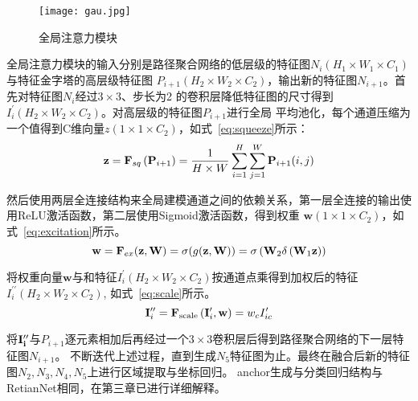 \begin{figure}[htbp]                     
  \centering                      
  \texttt{[image: gau.jpg]}                      
  \caption{全局注意力模块}                      
  \label{fig:gau}       
\end{figure}  

全局注意力模块的输入分别是路径聚合网络的低层级的特征图$N_i(H_1 \times W_1 \times C_1)$与特征金字塔的高层级特征图
$P_{i + 1}(H_2 \times W_2 \times C_2)$，输出新的特征图$N_{i + 1}$。首先对特征图$N_i$经过$3\times 3$、步长为2
的卷积层降低特征图的尺寸得到$I^{\prime}_i({H_2} \times {W_2} \times {C_2})$。对高层级的特征图$P_{i + 1}$进行全局
平均池化，每个通道压缩为一个值得到C维向量$z(1 \times 1 \times {C_2})$，如式~\ref{eq:squeeze}所示：
\begin{equation}   
  \mathbf{z} = {{\bf{F}}_{sq}}\left( {{{\bf{P}}_{i + 1}}} \right) = \frac{1}{{H \times W}}\sum\limits_{i = 1}^H {\sum\limits_{j = 1}^W {{{\bf{P}}_{i + 1}}} } (i,j)
  \label{eq:squeeze} 
\end{equation}

然后使用两层全连接结构来全局建模通道之间的依赖关系，第一层全连接的输出使用ReLU激活函数，第二层使用Sigmoid激活函数，得到权重
$\mathbf{w}(1 \times 1 \times {C_2})$，如式~\ref{eq:excitation}所示。
\begin{equation}   
  {\bf{w}} = {{\bf{F}}_{ex}}({\bf{z}},{\bf{W}}) = \sigma (g({\bf{z}},{\bf{W}})) = \sigma \left( {{{\bf{W}}_2}\delta \left( {{{\bf{W}}_1}{\bf{z}}} \right)} \right)
  \label{eq:excitation} 
\end{equation}

将权重向量$\mathbf{w}$与和特征$I^{\prime}_i({H_2} \times {W_2} \times {C_2})$按通道点乘得到加权后的特征$I^{\prime \prime}_i({H_2} \times {W_2} \times {C_2})$,
如式~\ref{eq:scale}所示。
\begin{equation}   
  {\bf{I}}_i^{\prime \prime } = {{\bf{F}}_{{\rm{scale }}}}\left( {{\bf{I}}_i^\prime ,{\bf{w}}} \right) = {w_c}I^\prime_{ic}
  \label{eq:scale} 
\end{equation}

将$\bf{I}_i^{\prime \prime}$与$P_{i + 1}$逐元素相加后再经过一个$3\times3$卷积层后得到路径聚合网络的下一层特征图$N_{i + 1}$。
不断迭代上述过程，直到生成$N_5$特征图为止。最终在融合后新的特征图$N_2, N_3, N_4, N_5$上进行区域提取与坐标回归。
anchor生成与分类回归结构与RetianNet相同，在第三章已进行详细解释。

